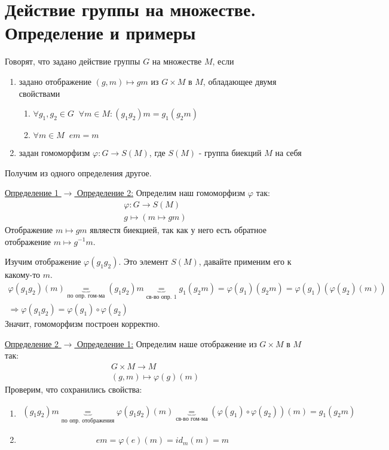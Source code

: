 \section{Действие группы на множестве. Определение и примеры}
\begin{conj}
    Говорят, что задано действие группы $G$ на множестве $M$, если
    \begin{enumerate}
        \item задано отображение $(g, m) \mapsto gm$ из  $G \times M$ в $M$, обладающее двумя свойствами
        \begin{enumerate}
            \item $\forall g_1, g_2 \in G \;\; \forall m \in M : (g_1g_2)m = g_1(g_2m)$
            \item $\forall m \in M \;\; em = m$
        \end{enumerate}
        \item задан гомоморфизм $\varphi: G \to S(M)$, где $S(M)$ - группа биекций $M$ на себя
    \end{enumerate}
\end{conj}
Получим из одного определения другое.

\underline{Определение 1 $\to$ Определение 2:} Определим наш гомоморфизм $\varphi$ так:
\begin{gather*}
    \varphi: G \to S(M) \\
    g \mapsto (m \mapsto gm)
\end{gather*} 
Отображение $m \mapsto gm$ являестя биекцией, так как у него есть обратное отображение $m \mapsto g^{-1}m$.

Изучим отображение $\varphi(g_1g_2)$. Это элемент $S(M)$, давайте применим его к какому-то $m$.
\begin{gather*}
    \varphi(g_1g_2)(m) \underbrace{=}_{\text{по опр. гом-ма}} (g_1g_2)m \underbrace{=}_{\text{св-во опр. 1}} g_1(g_2m) = \varphi(g_1)(g_2m) = \varphi(g_1)(\varphi(g_2)(m)) \\
    \Rightarrow \varphi(g_1g_2) = \varphi(g_1) \circ \varphi(g_2)
\end{gather*}
Значит, гомоморфизм построен корректно.

\underline{Определение 2 $\to$ Определение 1:} Определим наше отображение из $G \times M$ в $M$ так:
\begin{gather*}
    G \times M \to M \\
    (g, m) \mapsto \varphi(g)(m)
\end{gather*}
Проверим, что сохранились свойства:
\begin{enumerate}
    \item \begin{gather*}
        (g_1g_2)m \underbrace{=}_{\text{по опр. отображения}} \varphi(g_1g_2)(m) \underbrace{=}_{\text{св-во гом-ма}} (\varphi(g_1) \circ \varphi(g_2))(m) = g_1(g_2m)
    \end{gather*}
    \item \[ em = \varphi(e)(m) = id_m(m) = m \]
\end{enumerate}

